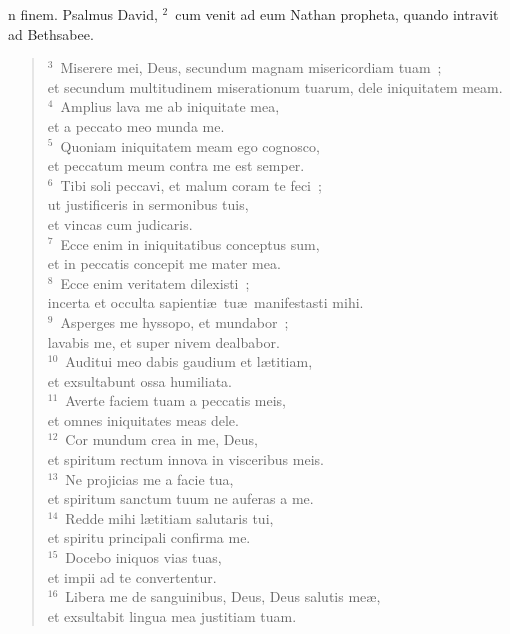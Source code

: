 \bchapter
{}n finem. Psalmus David,
${}^{2}$~cum venit ad eum Nathan propheta, quando intravit ad Bethsabee.
\begin{flushleft}\begin{verse}${}^{3}$~Miserere mei, Deus, secundum magnam misericordiam tuam~;\\ et secundum multitudinem miserationum tuarum, dele iniquitatem meam.\\
${}^{4}$~Amplius lava me ab iniquitate mea,\\ et a peccato meo munda me.\\
${}^{5}$~Quoniam iniquitatem meam ego cognosco,\\ et peccatum meum contra me est semper.\\
${}^{6}$~Tibi soli peccavi, et malum coram te feci~;\\ ut justificeris in sermonibus tuis,\\ et vincas cum judicaris.\\
${}^{7}$~Ecce enim in iniquitatibus conceptus sum,\\ et in peccatis concepit me mater mea.\\
${}^{8}$~Ecce enim veritatem dilexisti~;\\ incerta et occulta sapienti\ae\ tu\ae\ manifestasti mihi.\\
${}^{9}$~Asperges me hyssopo, et mundabor~;\\ lavabis me, et super nivem dealbabor.\\
${}^{10}$~Auditui meo dabis gaudium et l\ae titiam,\\ et exsultabunt ossa humiliata.\\
${}^{11}$~Averte faciem tuam a peccatis meis,\\ et omnes iniquitates meas dele.\\
${}^{12}$~Cor mundum crea in me, Deus,\\ et spiritum rectum innova in visceribus meis.\\
${}^{13}$~Ne projicias me a facie tua,\\ et spiritum sanctum tuum ne auferas a me.\\
${}^{14}$~Redde mihi l\ae titiam salutaris tui,\\ et spiritu principali confirma me.\\
${}^{15}$~Docebo iniquos vias tuas,\\ et impii ad te convertentur.\\
${}^{16}$~Libera me de sanguinibus, Deus, Deus salutis me\ae ,\\ et exsultabit lingua mea justitiam tuam.\\

\end{verse}
\end{flushleft}
